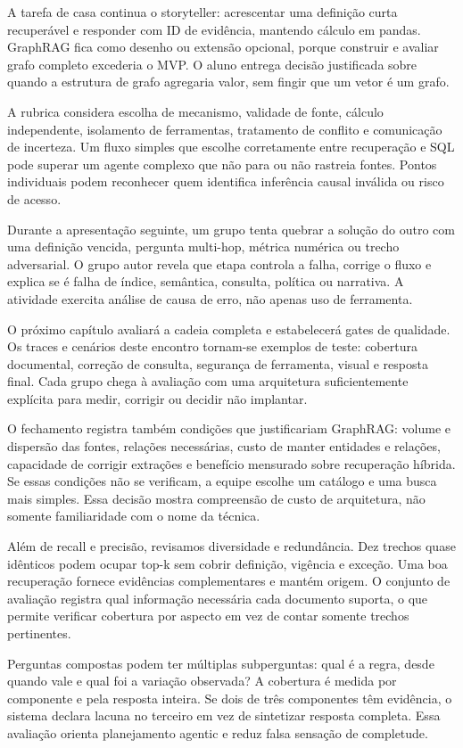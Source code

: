 A tarefa de casa continua o storyteller: acrescentar uma definição curta recuperável e responder com ID de evidência, mantendo cálculo em pandas. GraphRAG fica como desenho ou extensão opcional, porque construir e avaliar grafo completo excederia o MVP. O aluno entrega decisão justificada sobre quando a estrutura de grafo agregaria valor, sem fingir que um vetor é um grafo.

A rubrica considera escolha de mecanismo, validade de fonte, cálculo independente, isolamento de ferramentas, tratamento de conflito e comunicação de incerteza. Um fluxo simples que escolhe corretamente entre recuperação e SQL pode superar um agente complexo que não para ou não rastreia fontes. Pontos individuais podem reconhecer quem identifica inferência causal inválida ou risco de acesso.

Durante a apresentação seguinte, um grupo tenta quebrar a solução do outro com uma definição vencida, pergunta multi-hop, métrica numérica ou trecho adversarial. O grupo autor revela que etapa controla a falha, corrige o fluxo e explica se é falha de índice, semântica, consulta, política ou narrativa. A atividade exercita análise de causa de erro, não apenas uso de ferramenta.

O próximo capítulo avaliará a cadeia completa e estabelecerá gates de qualidade. Os traces e cenários deste encontro tornam-se exemplos de teste: cobertura documental, correção de consulta, segurança de ferramenta, visual e resposta final. Cada grupo chega à avaliação com uma arquitetura suficientemente explícita para medir, corrigir ou decidir não implantar.

O fechamento registra também condições que justificariam GraphRAG: volume e dispersão das fontes, relações necessárias, custo de manter entidades e relações, capacidade de corrigir extrações e benefício mensurado sobre recuperação híbrida. Se essas condições não se verificam, a equipe escolhe um catálogo e uma busca mais simples. Essa decisão mostra compreensão de custo de arquitetura, não somente familiaridade com o nome da técnica.

Além de recall e precisão, revisamos diversidade e redundância. Dez trechos quase idênticos podem ocupar top-k sem cobrir definição, vigência e exceção. Uma boa recuperação fornece evidências complementares e mantém origem. O conjunto de avaliação registra qual informação necessária cada documento suporta, o que permite verificar cobertura por aspecto em vez de contar somente trechos pertinentes.

Perguntas compostas podem ter múltiplas subperguntas: qual é a regra, desde quando vale e qual foi a variação observada? A cobertura é medida por componente e pela resposta inteira. Se dois de três componentes têm evidência, o sistema declara lacuna no terceiro em vez de sintetizar resposta completa. Essa avaliação orienta planejamento agentic e reduz falsa sensação de completude.

